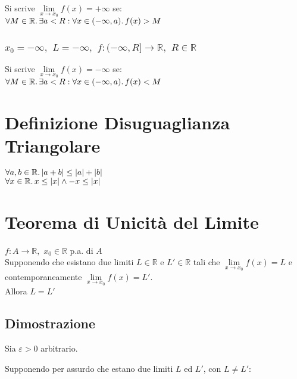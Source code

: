 \documentclass[a4paper, twoside, italian, 11pt]{book}
\newcommand{\abs}[1] {\left | #1 \right |}
\newcommand{\R}{\mathbb{R}}
\begin{document}
\noindent
Si scrive $\lim\limits_{x \to x_0} f(x) = +\infty$ se: \\

\noindent
$\forall M \in \R \ldotp \exists a < R : \forall x \in (-\infty, a) \ldotp f(x) > M$


\subsubsection{$x_0 = -\infty,$ $L = -\infty,$ $f : (-\infty, R] \rightarrow \R,$ $R \in \R$}

\noindent
Si scrive $\lim\limits_{x \to x_0} f(x) = -\infty$ se: \\

\noindent
$\forall M \in \R \ldotp \exists a < R : \forall x \in (-\infty, a) \ldotp f(x) < M$



\section{Definizione Disuguaglianza Triangolare}

\noindent
$\forall a,b \in \R \ldotp \abs{a + b} \leq \abs{a} + \abs{b}$ \\

\noindent
$\forall x \in \R \ldotp x \leq \abs{x} \land -x \leq \abs{x}$



\section{Teorema di Unicità del Limite}

\noindent
$f : A \rightarrow \R,$ $x_{0} \in \R$ p.a. di $A$ \\

\noindent
Supponendo che esistano due limiti $L \in \R$ e $L' \in \R$ tali che $\lim\limits_{x \to x_0} f(x) = L$ e contemporaneamente $\lim\limits_{x \to x_0} f(x) = L'$. \\

\noindent
Allora $L = L'$



\subsection{Dimostrazione}

\noindent
Sia $\varepsilon > 0$ arbitrario.

\noindent
Supponendo per assurdo che estano due limiti $L$ ed $L'$, con $L \neq L'$: \\
\end{document}
